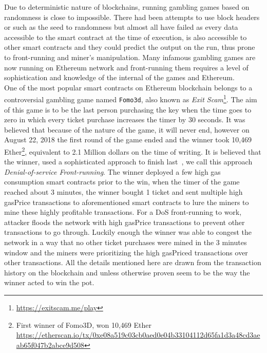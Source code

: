 Due to deterministic nature of blockchains, running gambling games based on randomness is close to impossible. There had been attempts to use block headers or such as the seed to randomness but almost all have failed as every data accessible to the smart contract at the time of execution, is also accessible to other smart contracts and they could predict the output on the run, thus prone to front-running and miner's manipulation. Many infamous gambling games are now running on Ethereum network and front-running them requires a level of sophistication and knowledge of the internal of the games and Ethereum.\\
One of the most popular smart contracts on Ethereum blockchain belongs to a controversial gambling game named \texttt{Fomo3d}, also known as \textit{Exit Scam}\footnote{\url{https://exitscam.me/play}}. The aim of this game is to be the last person purchasing the key when the time goes to zero in which every ticket purchase increases the timer by 30 seconds. It was believed that because of the nature of the game, it will never end, however on August 22, 2018 the first round of the game ended and the winner took 10,469 Ether\footnote{First winner of Fomo3D, won 10,469 Ether \url{ https://etherscan.io/tx/0xe08a519c03cb0aed0e04b33104112d65fa1d3a48cd3aeab65f047b2abce9d508}}, equivalent to 2.1 Million dollars on the time of writing. 
It is believed that the winner, used a sophisticated approach to finish last~\cite{fomo3dhacker}, we call this approach \textit{Denial-of-service Front-running}. The winner deployed a few high gas consumption smart contracts prior to the win, when the timer of the game reached about 3 minutes, the winner bought 1 ticket and sent multiple high gasPrice transactions to aforementioned smart contracts to lure the miners to mine these highly profitable transactions. For a DoS front-running to work, attacker floods the network with high gasPrice transactions to prevent other transactions to go through. Luckily enough the winner was able to congest the network in a way that no other ticket purchases were mined in the 3 minutes window and the miners were prioritizing the high gasPriced transactions over other transactions. All the details mentioned here are drawn from the transaction history on the blockchain and unless otherwise proven seem to be the way the winner acted to win the pot. 




